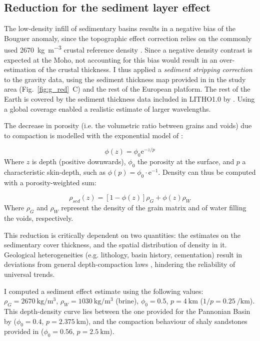 \subsection{Reduction for the sediment layer effect}
\label{ss:Appl:GravSed}
The low-density infill of sedimentary basins results in a negative bias of the Bouguer anomaly, since the topographic effect correction relies on the commonly used 2670~\si{\kilo \gram \per \cubic \metre} crustal reference density \parencite{Hinze2003}.
Since a negative density contrast is expected at the Moho, not accounting for this bias would result in an over-estimation of the crustal thickness.
I thus applied a \textit{sediment stripping correction} \parencite{Chen2014} to the gravity data, using the sediment thickness map provided in \textcite{Tesauro2008} in the study area (Fig.~\ref{fig:g_red}~C) and the rest of the European platform.
The rest of the Earth is covered by the sediment thickness data included in {LITHO1.0} by \textcite{Pasyanos2014}.
Using a global coverage enabled a realistic estimate of larger wavelengths.

The decrease in porosity (i.e. the volumetric ratio between grains and voids) due to compaction is modelled with the exponential model of \textcite{woodside1961}:

\begin{equation}
	\label{eq:ExpCompactionPhi}
	\phi(z) = \phi_0 \mathrm{e}^{-z/p}
\end{equation}
Where $z$ is depth (positive downwards), $\phi_0$ the porosity at the surface, and $p$ a characteristic skin-depth, such as $\phi(p) = \phi_0 \cdot \mathrm{e}^{-1}$.
Density can thus be computed with a porosity-weighted sum:

\begin{equation}
	\label{eq:ExpCompactionRho}
	\rho_{sed}(z) = [1-\phi(z)] \rho_{G} + \phi(z) \rho_{W}
\end{equation}
Where $\rho_{G}$ and $\rho_{W}$ represent the density of the grain matrix and of water filling the voids, respectively.

This reduction is critically dependent on two quantities: the estimates on the sedimentary cover thickness, and the spatial distribution of density in it.
Geological heterogeneities (e.g. lithology, basin history, cementation) result in deviations from general depth-compaction laws \parencite{allen2013basin}, hindering the reliability of universal trends.

I computed a sediment effect estimate using the following values: $\rho_G = \SI{2670}{\kilo \gram \per \cubic \metre}$, $\rho_W = \SI{1030}{\kilo \gram \per \cubic \metre}$ (brine), $\phi_0 = \num{0.5}$, $p = \SI{4}{\kilo \metre}$ ($1/p = \SI{0.25}{\per \kilo \metre}$).
This depth-density curve lies between the one provided for the Pannonian Basin by \textcite{Kaban2010} ($\phi_0 = \num{0.4}$, $p = \SI{2.375}{\kilo \metre}$), and the compaction behaviour of shaly sandstones provided in \parencite{allen2013basin} ($\phi_0 = \num{0.56}$, $p = \SI{2.5}{\kilo \metre}$).

